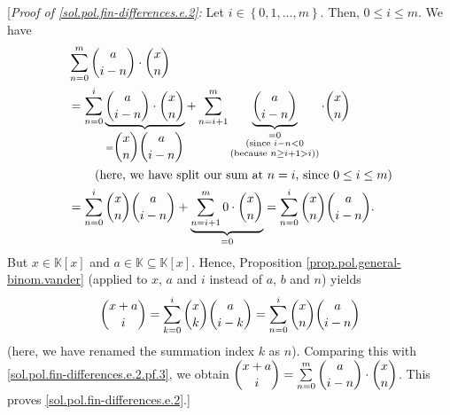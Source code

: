 \documentclass[paper=a4, fontsize=12pt]{scrartcl}%
\let\sumnonlimits\sum
\renewcommand{\sum}{\sumnonlimits\limits}
\theoremstyle{plainsl}
\theoremstyle{definition}
\theoremstyle{remark}
\begin{document}
[\textit{Proof of \eqref{sol.pol.fin-differences.e.2}:} Let $i\in\left\{
0,1,\ldots,m\right\}  $. Then, $0\leq i\leq m$. We have%
\begin{align}
&  \sum_{n=0}^{m}\dbinom{a}{i-n}\cdot\dbinom{x}{n}\nonumber\\
&  =\sum_{n=0}^{i}\underbrace{\dbinom{a}{i-n}\cdot\dbinom{x}{n}}_{=\dbinom
{x}{n}\dbinom{a}{i-n}}+\sum_{n=i+1}^{m}\underbrace{\dbinom{a}{i-n}%
}_{\substack{=0\\\text{(since }i-n<0\\\text{(because }n\geq i+1>i\text{))}%
}}\cdot\dbinom{x}{n}\nonumber\\
&  \qquad\left(  \text{here, we have split our sum at }n=i\text{, since }0\leq
i\leq m\right) \nonumber\\
&  =\sum_{n=0}^{i}\dbinom{x}{n}\dbinom{a}{i-n}+\underbrace{\sum_{n=i+1}%
^{m}0\cdot\dbinom{x}{n}}_{=0}=\sum_{n=0}^{i}\dbinom{x}{n}\dbinom{a}{i-n}.
\label{sol.pol.fin-differences.e.2.pf.3}%
\end{align}
But $x\in\mathbb{K}\left[  x\right]  $ and $a\in\mathbb{K}\subseteq
\mathbb{K}\left[  x\right]  $. Hence, Proposition
\ref{prop.pol.general-binom.vander} (applied to $x$, $a$ and $i$ instead of
$a$, $b$ and $n$) yields%
\[
\dbinom{x+a}{i}=\sum_{k=0}^{i}\dbinom{x}{k}\dbinom{a}{i-k}=\sum_{n=0}%
^{i}\dbinom{x}{n}\dbinom{a}{i-n}%
\]
(here, we have renamed the summation index $k$ as $n$). Comparing this with
\eqref{sol.pol.fin-differences.e.2.pf.3}, we obtain $\dbinom{x+a}{i}%
=\sum_{n=0}^{m}\dbinom{a}{i-n}\cdot\dbinom{x}{n}$. This proves \eqref{sol.pol.fin-differences.e.2}.]
\end{document}
